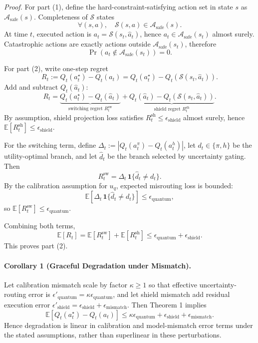 \textit{Proof.}
For part (1), define the hard-constraint-satisfying action set in state $s$ as $\mathcal{A}_{\mathrm{safe}}(s)$. Completeness of $\mathcal{S}$ states
\[
\forall (s,a),\quad \mathcal{S}(s,a)\in \mathcal{A}_{\mathrm{safe}}(s).
\]
At time $t$, executed action is $a_t=\mathcal{S}(s_t,\hat a_t)$, hence $a_t\in\mathcal{A}_{\mathrm{safe}}(s_t)$ almost surely. Catastrophic actions are exactly actions outside $\mathcal{A}_{\mathrm{safe}}(s_t)$, therefore
\[
\Pr(a_t\notin\mathcal{A}_{\mathrm{safe}}(s_t))=0.
\]

For part (2), write one-step regret
\[
R_t := Q_t(a_t^{\star})-Q_t(a_t)=Q_t(a_t^{\star})-Q_t(\mathcal{S}(s_t,\hat a_t)).
\]
Add and subtract $Q_t(\hat a_t)$:
\[
R_t=\underbrace{Q_t(a_t^{\star})-Q_t(\hat a_t)}_{\text{switching regret }R_t^{\mathrm{sw}}}
+\underbrace{Q_t(\hat a_t)-Q_t(\mathcal{S}(s_t,\hat a_t))}_{\text{shield regret }R_t^{\mathrm{sh}}}.
\]
By assumption, shield projection loss satisfies $R_t^{\mathrm{sh}}\le \epsilon_{\text{shield}}$ almost surely, hence $\mathbb{E}[R_t^{\mathrm{sh}}]\le \epsilon_{\text{shield}}$.

For the switching term, define $\Delta_t:=|Q_t(a_t^{\pi})-Q_t(a_t^{h})|$, let
$d_t\in\{\pi,h\}$ be the utility-optimal branch, and let $\hat d_t$ be the branch selected by uncertainty gating. Then
\[
R_t^{\mathrm{sw}} = \Delta_t\,\mathbf{1}\{\hat d_t\neq d_t\}.
\]
By the calibration assumption for $u_q$, expected misrouting loss is bounded:
\[
\mathbb{E}[\Delta_t\,\mathbf{1}\{\hat d_t\neq d_t\}]\le\epsilon_{\text{quantum}},
\]
so $\mathbb{E}[R_t^{\mathrm{sw}}]\le\epsilon_{\text{quantum}}$.

Combining both terms,
\[
\mathbb{E}[R_t]
=\mathbb{E}[R_t^{\mathrm{sw}}]+\mathbb{E}[R_t^{\mathrm{sh}}]
\le \epsilon_{\text{quantum}}+\epsilon_{\text{shield}}.
\]
This proves part (2).

\paragraph{Corollary 1 (Graceful Degradation under Mismatch).}
Let calibration mismatch scale by factor $\kappa\ge 1$ so that effective uncertainty-routing error is $\epsilon'_{\text{quantum}}=\kappa\epsilon_{\text{quantum}}$, and let shield mismatch add residual execution error $\epsilon'_{\text{shield}}=\epsilon_{\text{shield}}+\epsilon_{\text{mismatch}}$. Then Theorem 1 implies
\[
\mathbb{E}[Q_t(a_t^{\star})-Q_t(a_t)]
\le
\kappa\epsilon_{\text{quantum}}+\epsilon_{\text{shield}}+\epsilon_{\text{mismatch}}.
\]
Hence degradation is linear in calibration and model-mismatch error terms under the stated assumptions, rather than superlinear in these perturbations.

